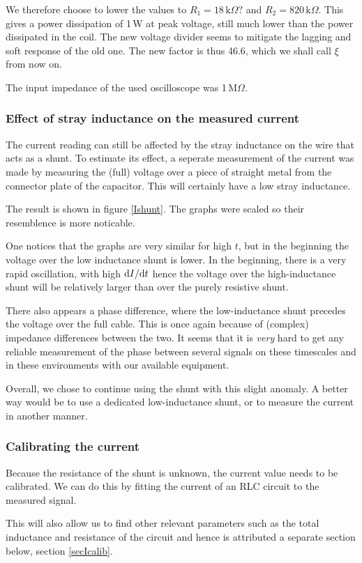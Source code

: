 
We therefore choose to lower the values to $R_1 = 18\,\mathrm{k}\Omega?$ 
and $R_2 = 820\,\mathrm{k}\Omega$. This gives a power dissipation of 1\,W 
at peak voltage, still much lower than the power dissipated in the coil.  
The new voltage divider seems to mitigate the lagging and soft response of 
the old one. The new factor is thus 46.6, which we shall call $\xi$ from 
now on.






The input impedance of the used oscilloscope was 1\,M$\Omega$.



\subsubsection{Effect of stray inductance on the measured current}
The current reading can still be affected by the stray inductance on the 
wire that acts as a shunt. To estimate its effect, a seperate measurement 
of the current was made by measuring the (full) voltage over a piece of 
straight metal from the connector plate of the capacitor. This will 
certainly have a low stray inductance.

The result is shown in figure \ref{Ishunt}. The graphs were scaled so their 
resemblence is more noticable.


One notices that the graphs are very similar for high $t$, but in the 
beginning the voltage over the low inductance shunt is lower. In the 
beginning, there is a very rapid oscillation, with high $\mathrm d I / \mathrm d t$ 
hence the voltage over the high-inductance shunt will be relatively larger 
than over the purely resistive shunt.

There also appears a phase difference, where the low-inductance shunt 
precedes the voltage over the full cable. This is once again because of 
(complex) impedance differences between the two. It seems that it is 
\emph{very} hard to get any reliable measurement of the phase between 
several signals on these timescales and in these environments with our 
available equipment.

Overall, we chose to continue using the shunt with this slight anomaly.  A 
better way would be to use a dedicated low-inductance shunt, or to measure 
the current in another manner.



\subsubsection{Calibrating the current}
Because the resistance of the shunt is unknown, the current value needs to 
be calibrated. We can do this by fitting the current of an RLC circuit to 
the measured signal.

This will also allow us to find other relevant parameters such as the total 
inductance and resistance of the circuit and hence is attributed a separate 
section below, section \ref{secIcalib}.


